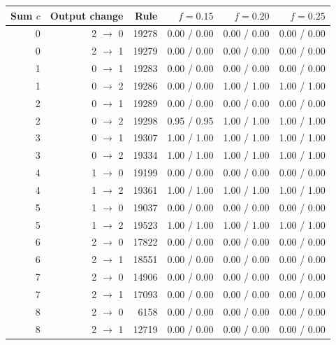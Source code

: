 \begin{center}
\begin{minipage}{\linewidth}\centering
\captionsetup{type=table,hypcap=false}
\caption{All single-response changes to Rule~19280 with dealer depth $h=100$. Each entry gives majority probability with technical traders held / active over 20 starting markets and 3,000 post-switch steps. Outputs are Buy $=0$, Hold $=1$, and Sell $=2$. This descriptive screen used no multiplicity adjustment.}
\label{tab:revision-rules}
\footnotesize
\begin{tabular}{rrrrrr}
\toprule
Sum $c$ & Output change & Rule & $f=0.15$ & $f=0.20$ & $f=0.25$ \\
\midrule
0 & 2 $\to$ 0 & 19278 & 0.00 / 0.00 & 0.00 / 0.00 & 0.00 / 0.00 \\
0 & 2 $\to$ 1 & 19279 & 0.00 / 0.00 & 0.00 / 0.00 & 0.00 / 0.00 \\
1 & 0 $\to$ 1 & 19283 & 0.00 / 0.00 & 0.00 / 0.00 & 0.00 / 0.00 \\
1 & 0 $\to$ 2 & 19286 & 0.00 / 0.00 & 1.00 / 1.00 & 1.00 / 1.00 \\
2 & 0 $\to$ 1 & 19289 & 0.00 / 0.00 & 0.00 / 0.00 & 0.00 / 0.00 \\
2 & 0 $\to$ 2 & 19298 & 0.95 / 0.95 & 1.00 / 1.00 & 1.00 / 1.00 \\
3 & 0 $\to$ 1 & 19307 & 1.00 / 1.00 & 1.00 / 1.00 & 1.00 / 1.00 \\
3 & 0 $\to$ 2 & 19334 & 1.00 / 1.00 & 1.00 / 1.00 & 1.00 / 1.00 \\
4 & 1 $\to$ 0 & 19199 & 0.00 / 0.00 & 0.00 / 0.00 & 0.00 / 0.00 \\
4 & 1 $\to$ 2 & 19361 & 1.00 / 1.00 & 1.00 / 1.00 & 1.00 / 1.00 \\
5 & 1 $\to$ 0 & 19037 & 0.00 / 0.00 & 0.00 / 0.00 & 0.00 / 0.00 \\
5 & 1 $\to$ 2 & 19523 & 1.00 / 1.00 & 1.00 / 1.00 & 1.00 / 1.00 \\
6 & 2 $\to$ 0 & 17822 & 0.00 / 0.00 & 0.00 / 0.00 & 0.00 / 0.00 \\
6 & 2 $\to$ 1 & 18551 & 0.00 / 0.00 & 0.00 / 0.00 & 0.00 / 0.00 \\
7 & 2 $\to$ 0 & 14906 & 0.00 / 0.00 & 0.00 / 0.00 & 0.00 / 0.00 \\
7 & 2 $\to$ 1 & 17093 & 0.00 / 0.00 & 0.00 / 0.00 & 0.00 / 0.00 \\
8 & 2 $\to$ 0 & 6158 & 0.00 / 0.00 & 0.00 / 0.00 & 0.00 / 0.00 \\
8 & 2 $\to$ 1 & 12719 & 0.00 / 0.00 & 0.00 / 0.00 & 0.00 / 0.00 \\
\bottomrule
\end{tabular}
\end{minipage}
\end{center}


